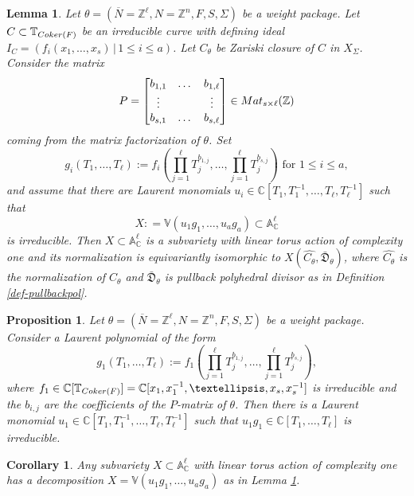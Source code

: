 \documentclass[10pt,a4paper]{amsart}
\newtheorem{lemma}{Lemma}
\newtheorem{proposition}{Proposition}
\newtheorem{corollary}{Corollary}
\begin{document}
\begin{lemma}\label{lem-equa-tvar}
Let $\theta =  (\overline{N}=  \mathbb{Z}^{\ell}, N  =  \mathbb{Z}^{n}, F, S,\Sigma)$ be a weight package.
Let $C\subset \mathbb{T}_{{\rm Coker}(F)}$ be an irreducible curve with defining ideal $I_{C} =  (f_{i}(x_{1}, \ldots, x_{s})\,|\, 1\leq i\leq a)$. Let $C_{\theta}$ be Zariski closure of $C$ in $X_{\Sigma}$. Consider the matrix 
$$P =   \begin{bmatrix} 
     b_{1,1} & \dots & b_{1, \ell}\\
    \vdots &     & \vdots  \\
     b_{s,1} & \dots & b_{s, \ell}
    \end{bmatrix}\in {\rm Mat}_{s\times \ell}(\mathbb{Z})$$
coming from the matrix factorization of $\theta$.
Set 
$$g_{i}(T_{1}, \ldots, T_{\ell}):= f_{i}\left(\prod_{j = 1}^{\ell}T_{j}^{b_{1, j}}, \ldots, \prod_{j = 1}^{\ell}T_{j}^{b_{s, j}}\right)\text{ for } 1\leq i\leq a,$$
and assume that there are Laurent monomials $u_{i}\in \mathbb{C}[T_{1}, T_{1}^{-1}, \ldots, T_{\ell}, T_{\ell}^{-1}]$ such
that $$X: = \mathbb{V}(u_{1}g_{1}, \ldots, u_{a}g_{a})\subset \mathbb{A}^{\ell}_{\mathbb{C}}$$ is irreducible. 
Then $X\subset \mathbb{A}^{\ell}_{\mathbb{C}}$ is a subvariety with linear torus action of complexity one and its normalization is equivariantly isomorphic to $X(\widehat{C_{\theta}}, \bar{\mathfrak{D}}_{\theta})$, where $\widehat{C_{\theta}}$ is the normalization of $C_{\theta}$ and $\bar{\mathfrak{D}}_{\theta}$ is pullback polyhedral divisor as in Definition \ref{def-pullbackpol}.
\end{lemma}

\begin{proposition}\label{prop-Construction2-irredhyper}
Let
$\theta =   (\overline{N}=  \mathbb{Z}^{\ell}, N  =  \mathbb{Z}^{n}, F, S,\Sigma)$ be a weight package. Consider
a Laurent polynomial of the form
$$g_{1}(T_{1}, \ldots, T_{\ell}):= f_{1}\left(\prod_{j = 1}^{\ell}T_{j}^{b_{1, j}}, \ldots, \prod_{j = 1}^{\ell}T_{j}^{b_{s, j}}\right),$$
where  $f_{1}\in\mathbb{C}[\mathbb{T}_{{\rm Coker}(F)}] =  \mathbb{C}[x_{1}, x_{1}^{-1}, \ldots, x_{s}, x_{s}^{-1}]$ is irreducible and the $b_{i, j}$ are the coefficients of the $P$-matrix of $\theta$. 
 Then there is a Laurent monomial $u_{1}\in \mathbb{C}[T_{1}, T_{1}^{-1}, \ldots, T_{\ell}, T_{\ell}^{-1}]$
such that $u_{1} g_{1}\in \mathbb{C}[T_{1}, \ldots, T_{\ell}]$ is irreducible. 
\end{proposition}

\begin{corollary}\label{xoro-expliteqvarT}
Any subvariety $X\subset \mathbb{A}^{\ell}_{\mathbb{C}}$ with linear torus action of complexity one has a
decomposition $X  =  \mathbb{V}(u_{1}g_{1}, \ldots, u_{a}g_{a})$ as in Lemma \ref{lem-equa-tvar}.
\end{corollary}
\end{document}
